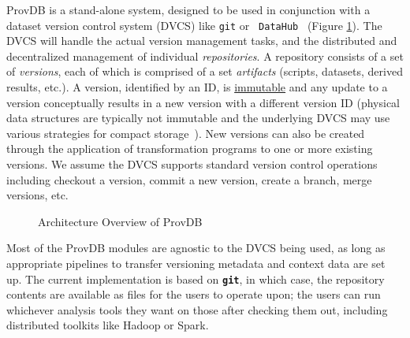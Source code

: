 \documentclass[11pt]{article}
\newcommand{\provdb}{{\sc ProvDB}\xspace}
\begin{document}
\provdb is a stand-alone system, designed to be used in conjunction with a
dataset version control system (DVCS) like {\tt git} or {\tt
DataHub}~\cite{datahub2015,provenance2015,dex@sigmod17,dataset2015} (Figure
\ref{fig:sys_arch}). The DVCS will handle the actual version management tasks,
and the distributed and decentralized management of individual {\em
repositories}.  A repository consists of a set of {\em versions}, each of which
is comprised of a set {\em artifacts} (scripts, datasets, derived results,
etc.). A version, identified by an ID, is \ul{immutable} and any update to a
version conceptually results in a new version with a different version ID
(physical data structures are typically not immutable and the underlying DVCS
may use various strategies for compact storage~\cite{dataset2015}). New versions
can  also be created through the application of transformation programs to one
or more existing versions.  We assume the DVCS supports standard version control
operations including {\sc checkout} a version, {\sc commit} a new version,
create a {\sc branch}, {\sc merge} versions, etc. 

\begin{figure}
\caption{Architecture Overview of \provdb}
\label{fig:sys_arch}
\end{figure}

Most of the \provdb modules are agnostic to the DVCS being used, as long as
appropriate pipelines to transfer versioning metadata and context data are set
up.  The current implementation is based on {\tt \bfseries git}, in which case,
the repository contents are available as files for the users to operate upon;
the users can run whichever analysis tools they want on those after checking
them out, including distributed toolkits like Hadoop or Spark. 
\end{document}
